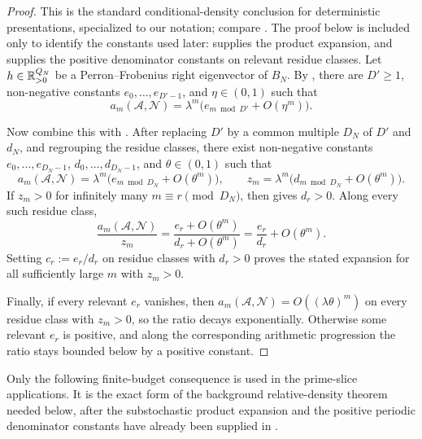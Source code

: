 \begin{proof}
  This is the standard conditional-density conclusion for deterministic
  presentations, specialized to our notation; compare
  \cite{HanselPerrin1989,Kozik2005Conditional,Koga2019Density,Montoya2025Relative,BertheGouletPerrin2025}.
  The proof below is included only to identify the constants used later:
   supplies the product
  expansion, and  supplies the positive
  denominator constants on relevant residue classes.
  Let \(h\in\mathbb{R}_{>0}^{Q_N}\) be a Perron--Frobenius right eigenvector of
  \(B_N\). By , there are
  \(D'\ge 1\), non-negative constants \(e_0,\dots,e_{D'-1}\), and
  \(\eta\in(0,1)\) such that
  \[
    a_m(\mathcal A,\mathcal N)
    =\lambda^m\bigl(e_{m\bmod D'}+O(\eta^m)\bigr).
  \]

  Now combine this with . After replacing \(D'\)
  by a common multiple \(D_N\) of \(D'\) and \(d_N\), and regrouping the
  residue classes, there exist non-negative constants
  \(e_0,\dots,e_{D_N-1}\), \(d_0,\dots,d_{D_N-1}\), and \(\theta\in(0,1)\)
  such that
  \[
    a_m(\mathcal A,\mathcal N)
    =\lambda^m\bigl(e_{m\bmod D_N}+O(\theta^m)\bigr),
    \qquad
    z_m=\lambda^m\bigl(d_{m\bmod D_N}+O(\theta^m)\bigr).
  \]
  If \(z_m>0\) for infinitely many \(m\equiv r\pmod {D_N}\), then
   gives \(d_r>0\). Along every such residue
  class,
  \[
    \frac{a_m(\mathcal A,\mathcal N)}{z_m}
    =\frac{e_r+O(\theta^m)}{d_r+O(\theta^m)}
    =\frac{e_r}{d_r}+O(\theta^m).
  \]
  Setting \(c_r:=e_r/d_r\) on residue classes with \(d_r>0\) proves the
  stated expansion for all sufficiently large \(m\) with \(z_m>0\).

  Finally, if every relevant \(e_r\) vanishes, then
  \(a_m(\mathcal A,\mathcal N)=O((\lambda\theta)^m)\) on every residue
  class with \(z_m>0\), so the ratio decays exponentially. Otherwise
  some relevant \(e_r\) is positive, and along the corresponding
  arithmetic progression the ratio stays bounded below by a positive
  constant.
\end{proof}

Only the following finite-budget consequence is used in the prime-slice
applications.
It is the exact form of the background relative-density theorem needed
below, after the substochastic product expansion and the positive
periodic denominator constants have already been supplied in
.

